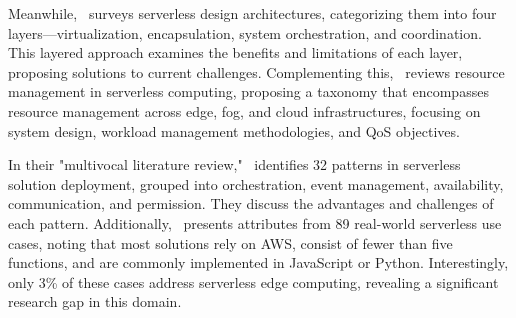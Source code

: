 Meanwhile,~\cite{li2022serverless-38} surveys serverless design architectures, categorizing them into four layers—virtualization, encapsulation, system orchestration, and coordination. This layered approach examines the benefits and limitations of each layer, proposing solutions to current challenges. Complementing this,~\cite{mampage2022holistic-18} reviews resource management in serverless computing, proposing a taxonomy that encompasses resource management across edge, fog, and cloud infrastructures, focusing on system design, workload management methodologies, and QoS objectives.

In their "multivocal literature review,"~\cite{taibi2020patterns-24} identifies 32 patterns in serverless solution deployment, grouped into orchestration, event management, availability, communication, and permission. They discuss the advantages and challenges of each pattern. Additionally,~\cite{eismann2020review-25} presents attributes from 89 real-world serverless use cases, noting that most solutions rely on AWS, consist of fewer than five functions, and are commonly implemented in JavaScript or Python. Interestingly, only 3\% of these cases address serverless edge computing, revealing a significant research gap in this domain.

